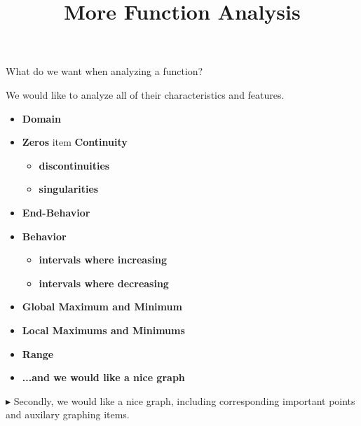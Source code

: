 \documentclass{ximera}
\title{More Function Analysis}
\begin{document}
\begin{abstract}
%
\end{abstract}
\maketitle






What do we want when analyzing a function?



We would like to analyze all of their characteristics and features. \\



\begin{itemize}
\item \textbf{\textcolor{red!80!black}{Domain}} 
\item \textbf{\textcolor{red!80!black}{Zeros}} 
item \textbf{\textcolor{red!80!black}{Continuity}} 
  \begin{itemize}
     \item \textbf{\textcolor{purple!85!blue}{discontinuities}} 
     \item \textbf{\textcolor{purple!85!blue}{singularities}} 
  \end{itemize}
\item \textbf{\textcolor{red!80!black}{End-Behavior}} 
\item \textbf{\textcolor{red!80!black}{Behavior}} 
  \begin{itemize}
     \item \textbf{\textcolor{purple!85!blue}{intervals where increasing}} 
     \item \textbf{\textcolor{purple!85!blue}{intervals where decreasing}} 
  \end{itemize}
\item \textbf{\textcolor{red!80!black}{Global Maximum and Minimum}} 
\item \textbf{\textcolor{red!80!black}{Local Maximums and Minimums}} 
\item \textbf{\textcolor{red!80!black}{Range}} 
\item \textbf{\textcolor{blue!55!black}{...and we would like a nice graph}} 
\end{itemize}




$\blacktriangleright$ Secondly, we would like a nice graph, including corresponding important points and auxilary graphing items.
\end{document}
